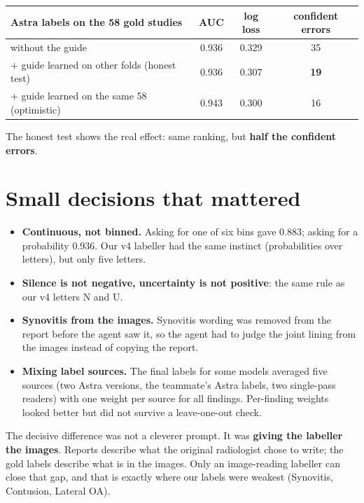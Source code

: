 \begin{center}\small
\begin{tabular}{lccc}
\toprule
Astra labels on the 58 gold studies & AUC & log loss & confident errors \\
\midrule
without the guide & 0.936 & 0.329 & 35 \\
+ guide learned on other folds (honest test) & 0.936 & 0.307 & \textbf{19} \\
+ guide learned on the same 58 (optimistic) & 0.943 & 0.300 & 16 \\
\bottomrule
\end{tabular}
\end{center}
The honest test shows the real effect: same ranking, but \textbf{half the confident errors}.

\section{Small decisions that mattered}

\begin{itemize}
\item \textbf{Continuous, not binned.} Asking for one of six bins gave 0.883; asking for a probability 0.936.
      Our v4 labeller had the same instinct (probabilities over letters), but only five letters.
\item \textbf{Silence is not negative, uncertainty is not positive}: the same rule as our v4 letters N and U.
\item \textbf{Synovitis from the images.} Synovitis wording was removed from the report before the agent saw it, so the
      agent had to judge the joint lining from the images instead of copying the report.
\item \textbf{Mixing label sources.} The final labels for some models averaged five sources (two Astra versions, the
      teammate's Astra labels, two single-pass readers) with one weight per source for all findings. Per-finding
      weights looked better but did not survive a leave-one-out check.
\end{itemize}

\begin{keyidea}
The decisive difference was not a cleverer prompt. It was \textbf{giving the labeller the images}. Reports describe
what the original radiologist chose to write; the gold labels describe what is in the images. Only an image-reading
labeller can close that gap, and that is exactly where our labels were weakest (Synovitis, Contusion, Lateral OA).
\end{keyidea}


